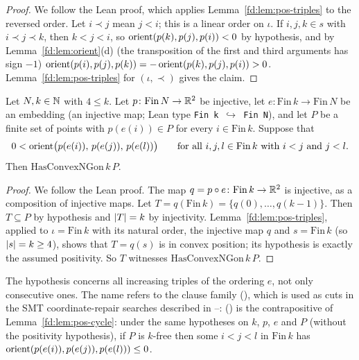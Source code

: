 \begin{proof}
We follow the Lean proof, which applies Lemma~\ref{fd:lem:pos-triples} to the reversed order. Let
$i\prec j$ mean $j<i$; this is a linear order on $\iota$. If $i,j,k\in s$ with $i\prec j\prec k$, then
$k<j<i$, so $\operatorname{orient}(p(k),p(j),p(i))<0$ by hypothesis, and by Lemma~\ref{fd:lem:orient}(d) (the
transposition of the first and third arguments has sign $-1$)
$\operatorname{orient}(p(i),p(j),p(k))=-\operatorname{orient}(p(k),p(j),p(i))>0$. Lemma~\ref{fd:lem:pos-triples} for $(\iota,\prec)$
gives the claim.
\end{proof}

\begin{lemma}\label{fd:lem:pos-cycle}\sloppy
Let $N,k\in\mathbb N$ with $4\le k$. Let $p\colon\mathrm{Fin}\,N\to\mathbb R^2$ be injective, let
$e\colon\mathrm{Fin}\,k\to\mathrm{Fin}\,N$ be an embedding (an injective map; Lean type
\texttt{Fin k}~$\hookrightarrow$~\texttt{Fin N}), and let $P$ be a finite set of points with $p(e(i))\in P$
for every $i\in\mathrm{Fin}\,k$. Suppose that
\[
  0<\operatorname{orient}\bigl(p(e(i)),\,p(e(j)),\,p(e(l))\bigr)\qquad\text{for all } i,j,l\in\mathrm{Fin}\,k
  \text{ with } i<j \text{ and } j<l .
\]
Then $\mathrm{HasConvexNGon}\,k\,P$.
\end{lemma}

\begin{proof}
We follow the Lean proof. The map $q=p\circ e\colon\mathrm{Fin}\,k\to\mathbb R^2$ is injective, as a composition of
injective maps. Let $T=q(\mathrm{Fin}\,k)=\{q(0),\dots,q(k-1)\}$. Then $T\subseteq P$ by hypothesis and
$\lvert T\rvert=k$ by injectivity. Lemma~\ref{fd:lem:pos-triples}, applied to $\iota=\mathrm{Fin}\,k$ with its
natural order, the injective map $q$ and $s=\mathrm{Fin}\,k$ (so $\lvert s\rvert=k\ge4$), shows that $T=q(s)$ is
in convex position; its hypothesis is exactly the assumed positivity. So $T$ witnesses
$\mathrm{HasConvexNGon}\,k\,P$.
\end{proof}

\begin{remark}\label{fd:rem:pos-cycle}\sloppy
The hypothesis concerns all increasing triples of the ordering $e$, not only consecutive ones. The name
refers to the clause family  (), which is
used as cuts in the SMT coordinate-repair searches described in --:
() is the
contrapositive of Lemma~\ref{fd:lem:pos-cycle}: under the same hypotheses on $k$, $p$, $e$ and $P$
(without the positivity hypothesis), if $P$ is $k$-free then some $i<j<l$ in $\mathrm{Fin}\,k$ has
$\operatorname{orient}(p(e(i)),p(e(j)),p(e(l)))\le0$.
\end{remark}

